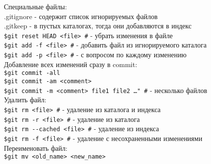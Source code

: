 \noindent Специальные файлы:\\
\indent.gitignore \indent - содержит список игнорируемых файлов \\
\indent.gitkeep \indent - в пустых каталогах, тогда они добавляются в индекс\\

\noindent\texttt{\$git reset HEAD <file> \indent \#} - убрать изменения в файле \\
\texttt{\$git  add -f <file> \indent \#} - добавить файл из игнорируемого каталога\\


\texttt{\$git add -p <file> \indent \#} - с вопросом по каждому изменению \\

\noindent Добавление всех изменений сразу в commit:\\
\indent \texttt{\$git commit -all \indent} \\
\indent \texttt{\$git commit -am <comment>} \\
\indent \texttt{\$git commit -m <comment> file1 file2 \ldots" \#} - несколько файлов \\

\noindent Удалить файл: \\
\indent \texttt{\$git rm <file> \indent \#} - удаление из каталога и индекса \\
\indent \texttt{\$git rm -r <file> \indent \#} - удаление из каталога\\
\indent \texttt{\$git rm {-}-cached <file> \indent \#} - удаление из индекса \\
\indent \texttt{\$git rm -f <file> \indent \#} - удаление с несохраненными изменениями\\

\noindent Переименовать файл:\\
\indent \texttt{\$git mv <old\_name> <new\_name>}